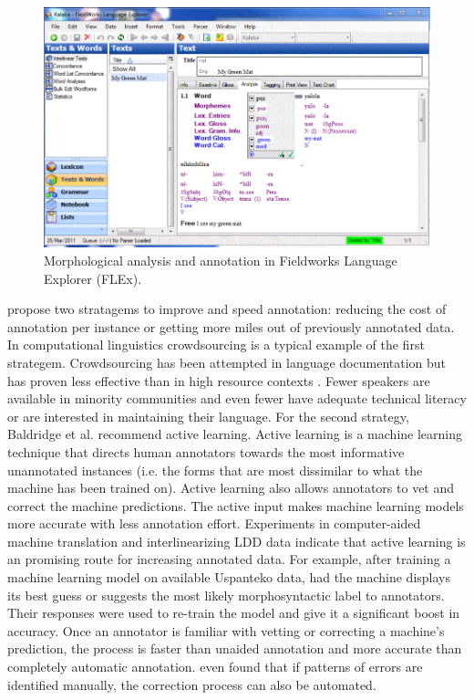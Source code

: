 \documentclass[12pt]{article}
\begin{document}
\begin{figure}[ht]
\label{fig:FLEX}
\begin{center}
\includegraphics[width=0.75\columnwidth]{FLEX.PNG}
\caption{Morphological analysis and annotation in Fieldworks Language Explorer (FLEx).}
\end{center}
\end{figure}

 propose two stratagems to improve and speed annotation: reducing the cost of annotation per instance or getting more miles out of previously annotated data. In computational linguistics crowdsourcing is a typical example of the first strategem. Crowdsourcing has been attempted in language documentation but has proven less effective than in high resource contexts \cite{bird_aikuma:_2014,bettinson_developing_2017}. Fewer speakers are available in minority communities and even fewer have adequate technical literacy or are interested in maintaining their language. For the second strategy, Baldridge et al. recommend active learning. Active learning is a machine learning technique that directs human annotators towards the most informative unannotated instances (i.e. the forms that are most dissimilar to what the machine has been trained on). Active learning also allows annotators to vet and correct the machine predictions. The active input makes machine learning models more accurate with less annotation effort. Experiments in computer-aided machine translation \cite{kothur_document-level_2018} and interlinearizing LDD data \cite{palmer_semi-automated_2009,palmer_evaluating_2009,palmer_computational_2010} indicate that active learning is an promising route for increasing annotated data. For example, after training a machine learning model on available Uspanteko data,  had the machine displays its best guess or suggests the most likely morphosyntactic label to annotators. Their responses were used to re-train the model and give it a significant boost in accuracy. Once an annotator is familiar with vetting or correcting a machine’s prediction, the process is faster than unaided annotation and more accurate than completely automatic annotation.  even found that if patterns of errors are identified manually, the correction process can also be automated.
\end{document}
